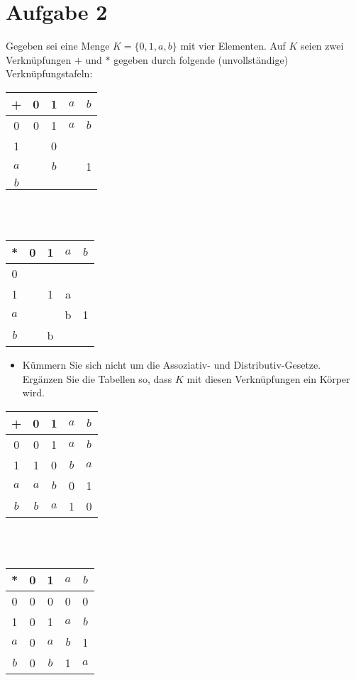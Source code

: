 \section*{Aufgabe 2}

Gegeben sei eine Menge $K = \{0, 1, a, b\}$ mit vier Elementen. Auf $K$ seien zwei Verknüpfungen $+$ und $\ast$ gegeben durch folgende (unvollständige) Verknüpfungstafeln:

\begin{table}[h]
\begin{tabular}{|c||c|c|c|c|}
\hline
+ & 0 & 1 & $a$ & $b$\\
\hline\hline
0 & 0 & 1 & $a$ & $b$\\
\hline
1 & & 0 & &\\
\hline
$a$ & & $b$ & & 1\\
\hline
$b$ & & & &\\
\hline
\end{tabular}\\\\

\begin{tabular}{|c||c|c|c|c|}
\hline
* & 0 & 1 & $a$ & $b$\\
\hline\hline
0 & & & &\\
\hline
1 & & 1 & a &\\
\hline
$a$ & & & b & 1\\
\hline
$b$ & & b & &\\
\hline
\end{tabular}
\end{table}
\begin{itemize}[leftmargin=*, label={a)}]
\item Kümmern Sie sich nicht um die Assoziativ- und Distributiv-Gesetze.\\
Ergänzen Sie die Tabellen so, dass $K$ mit diesen Verknüpfungen ein Körper wird.
\end{itemize}

\begin{table}[h]
\begin{tabular}{|c||c|c|c|c|}
\hline
 +  &  0  &  1  & $a$ & $b$\\
\hline\hline
 0  &  0  &  1  & $a$ & $b$\\
\hline
 1  &  1  &  0  & $b$ & $a$\\
\hline
$a$ & $a$ & $b$ &  0  &  1\\
\hline
$b$ & $b$ & $a$ &  1  &  0\\
\hline
\end{tabular}\\\\

\begin{tabular}{|c||c|c|c|c|}
\hline
 *  & 0  &  1  & $a$ & $b$\\
\hline\hline
 0  & 0 & 0 & 0 & 0\\
\hline
 1  & 0 & 1 & $a$ & $b$\\
\hline
$a$ & 0 & $a$ & $b$ & 1\\
\hline
$b$ & 0 & $b$ & 1 & $a$\\
\hline
\end{tabular}
\end{table}

